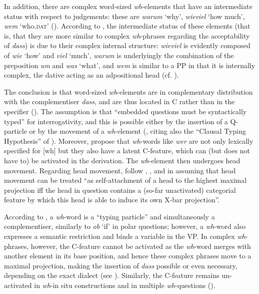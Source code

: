 In addition, there are complex word-sized \textit{wh}-elements that have an intermediate status with respect to judgements: these are \textit{warum} `why', \textit{wieviel} `how much', \textit{wem} `who.\textsc{dat}' (\citealt[89]{bayerbrandner2008}). According to \citet[89]{bayerbrandner2008}, the intermediate status of these elements (that is, that they are more similar to complex \textit{wh}-phrases regarding the acceptability of \textit{dass}) is due to their complex internal structure: \textit{wieviel} is evidently composed of \textit{wie} `how' and \textit{viel} `much', \textit{warum} is underlyingly the combination of the preposition \textit{um} and \textit{was} `what', and \textit{wem} is similar to a PP in that it is internally complex, the dative acting as an adpositional head (cf. \citealt{bayerbadermeng2001}).

The conclusion is that word-sized \textit{wh}-elements are in complementary distribution with the complementiser \textit{dass}, and are thus located in C rather than in the specifier (\citealt[89]{bayerbrandner2008}). The assumption is that ``embedded questions must be syntactically typed'' for interrogativity, and this is possible either by the insertion of a Q-particle or by the movement of a \textit{wh}-element (\citealt[89]{bayerbrandner2008}, citing also the ``Clausal Typing Hypothesis'' of \citealt{cheng1991diss}). Moreover, \citet[89]{bayerbrandner2008} propose that \textit{wh}-words like \textit{wer} are not only lexically specified for [wh] but they also have a latent C-feature, which can (but does not have to) be activated in the derivation. The \textit{wh}-element then undergoes head movement. Regarding head movement, \citet[89]{bayerbrandner2008} follow \citet{koeneman2000diss, koeneman2002}, \citet{bury2002}, \citet{fanselow2002} and \citet{brandner2004} in assuming that head movement can be treated ``as self-attachment of a head to the highest maximal projection iff the head in question contains a (so-far unactivated) categorial feature by which this head is able to induce its own X-bar projection''.

According to \citet[90]{bayerbrandner2008}, a  \textit{wh}-word is a ``typing particle'' and simultaneously a complementiser, similarly to \textit{ob} `if' in polar questions; however, a \textit{wh}-word also expresses a semantic restriction and binds a variable in the VP. In complex \textit{wh}-phrases, however, the C-feature cannot be activated as the \textit{wh}-word merges with another element in its base position, and hence these complex phrases move to a maximal projection, making the insertion of \textit{dass} possible or even necessary, depending on the exact dialect (see \citealt[90]{bayerbrandner2008}). Similarly, the C-feature remains un-activated in \textit{wh}-in situ constructions and in multiple \textit{wh}-questions (\citealt[90]{bayerbrandner2008}).

